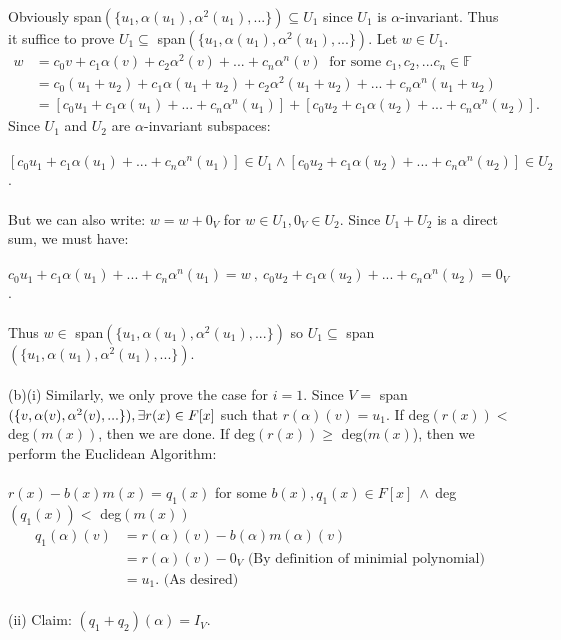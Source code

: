 \documentclass{article}
\begin{document}
Obviously span$(\{u_1,\alpha(u_1),\alpha^2(u_1),...\}) \subseteq U_1$ since $U_1$ is $\alpha$-invariant. Thus it suffice to prove $U_1 \subseteq$ span$(\{u_1,\alpha(u_1),\alpha^2(u_1),...\})$. Let $w\in U_1.$
\begin{align*}
w&=c_0v + c_1\alpha(v) + c_2\alpha^2(v) + ... + c_n\alpha^n(v)\ \text{ for some } c_1,c_2,...c_n \in \mathbb{F}\\
&=c_0(u_1+u_2) + c_1\alpha(u_1+u_2) + c_2\alpha^2(u_1+u_2) + ... + c_n\alpha^n(u_1+u_2)\\
&=[c_0u_1 + c_1\alpha(u_1) + ... + c_n\alpha^n(u_1)] + [c_0u_2 + c_1\alpha(u_2) + ... + c_n\alpha^n(u_2)].
\end{align*}
Since $U_1$ and $U_2$ are $\alpha$-invariant subspaces:\\\\ $[c_0u_1 + c_1\alpha(u_1) + ... + c_n\alpha^n(u_1)]\in U_1 \land [c_0u_2 + c_1\alpha(u_2) + ... + c_n\alpha^n(u_2)]\in U_2$.\\\\
But we can also write: $w = w + 0_V$ for $w\in U_1, 0_V\in U_2.$ Since $U_1 + U_2$ is a direct sum, we must have:\\\\
$c_0u_1 + c_1\alpha(u_1) + ... + c_n\alpha^n(u_1) = w \ , \ 
c_0u_2 + c_1\alpha(u_2) + ... + c_n\alpha^n(u_2) = 0_V$.\\\\
Thus $w\in$ span$(\{u_1,\alpha(u_1),\alpha^2(u_1),...\})$ so $U_1 \subseteq$ span$(\{u_1,\alpha(u_1),\alpha^2(u_1),...\}).$\\\\
(b)(i) Similarly, we only prove the case for $i=1$. Since $V = $ span$(\{v,\alpha(v),\alpha^2(v),...\}),\\ \exists r(x) \in F[x]$ such that $r(\alpha)(v) = u_1$. If deg$(r(x)) < $ deg$(m(x))$, then we are done. If deg$(r(x)) \geq $ deg$(m(x)$), then we perform the Euclidean Algorithm:\\\\
$r(x) - b(x)m(x) = q_1(x)$ for some $b(x),q_1(x)\in F[x]\  \land \  $deg$(q_1(x)) <  $ deg$(m(x))$\begin{align*}
q_1(\alpha)(v) &= r(\alpha)(v) - b(\alpha)m(\alpha)(v) \\&= r(\alpha)(v) - 0_V \text{  (By definition of minimial polynomial)} \\&= u_1. \text{ (As desired)}
\end{align*}\\
(ii) Claim: $(q_1 + q_2)(\alpha) = I_V.$\\\\
\end{document}
